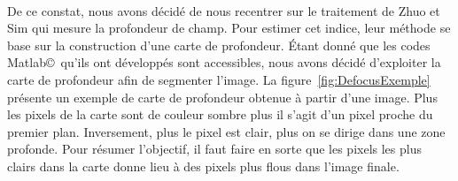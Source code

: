 \documentclass[11pt, french,screen]{report-rd-info}
\begin{document}
\paragraph*{}
De ce constat, nous avons décidé de nous recentrer sur le traitement de Zhuo et Sim \cite{Zhuo2011} qui mesure la profondeur de champ. Pour estimer cet indice, leur méthode se base sur la construction d'une carte de profondeur. Étant donné que les codes Matlab\copyright~qu'ils ont développés sont accessibles, nous avons décidé d'exploiter la carte de profondeur afin de segmenter l'image. La figure~\ref{fig:DefocusExemple} présente un exemple de carte de profondeur obtenue à partir d'une image. Plus les pixels de la carte sont de couleur sombre plus il s'agit d'un pixel proche du premier plan. Inversement, plus le pixel est clair, plus on se dirige dans une zone profonde. Pour résumer l'objectif, il faut faire en sorte que les pixels les plus clairs dans la carte donne lieu à des pixels plus flous dans l'image finale.
\end{document}
